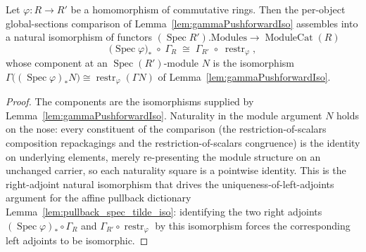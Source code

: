 \begin{lemma}

  \label{lem:gammaPushforwardNatIso}
  Let \(\varphi : R \to R'\) be a homomorphism of commutative rings. Then the
  per-object global-sections comparison of
  Lemma~\ref{lem:gammaPushforwardIso} assembles into a natural isomorphism of
  functors \((\operatorname{Spec} R').\mathrm{Modules} \to \operatorname{ModuleCat}(R)\)
  \[
    \bigl(\operatorname{Spec}\varphi\bigr)_* \;\circ\; \Gamma_R
    \;\cong\;
    \Gamma_{R'} \;\circ\; \operatorname{restr}_\varphi ,
  \]
  whose component at an \(\operatorname{Spec}(R')\)-module \(N\) is the isomorphism
  \(\Gamma\bigl((\operatorname{Spec}\varphi)_* N\bigr) \cong
  \operatorname{restr}_\varphi(\Gamma N)\) of
  Lemma~\ref{lem:gammaPushforwardIso}.
\end{lemma}

\begin{proof}
  \leanok
  The components are the isomorphisms supplied by
  Lemma~\ref{lem:gammaPushforwardIso}. Naturality in the module argument \(N\)
  holds on the nose: every constituent of the comparison
  (the restriction-of-scalars composition repackagings and the
  restriction-of-scalars congruence) is the identity on underlying elements,
  merely re-presenting the module structure on an unchanged carrier, so each
  naturality square is a pointwise identity. This is the right-adjoint natural
  isomorphism that drives the uniqueness-of-left-adjoints argument for the affine
  pullback dictionary Lemma~\ref{lem:pullback_spec_tilde_iso}: identifying the two
  right adjoints \((\operatorname{Spec}\varphi)_* \circ \Gamma_R\) and
  \(\Gamma_{R'} \circ \operatorname{restr}_\varphi\) by this isomorphism forces the
  corresponding left adjoints to be isomorphic.
\end{proof}

